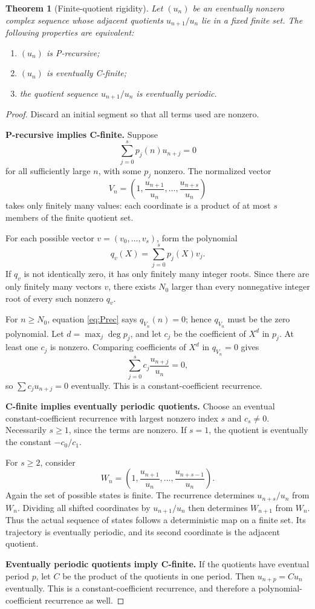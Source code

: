 \documentclass[11pt,letterpaper]{article}
\numberwithin{equation}{section}
\newtheorem{theorem}{Theorem}[section]
\theoremstyle{definition}
\theoremstyle{remark}
\begin{document}
\begin{theorem}[Finite-quotient rigidity]\label{thm:rigidity}
Let $(u_n)$ be an eventually nonzero complex sequence whose adjacent quotients $u_{n+1}/u_n$ lie in a fixed finite set. The following properties are equivalent:
\begin{enumerate}[label=(\roman*)]
\item $(u_n)$ is P-recursive;
\item $(u_n)$ is eventually C-finite;
\item the quotient sequence $u_{n+1}/u_n$ is eventually periodic.
\end{enumerate}
\end{theorem}
\begin{proof}
Discard an initial segment so that all terms used are nonzero.

\textbf{P-recursive implies C-finite.}
Suppose
\begin{equation}\label{eq:Prec}
 \sum_{j=0}^s p_j(n)u_{n+j}=0
\end{equation}
for all sufficiently large $n$, with some $p_j$ nonzero. The normalized vector
\[
 V_n=\left(1,\frac{u_{n+1}}{u_n},\ldots,\frac{u_{n+s}}{u_n}\right)
\]
takes only finitely many values: each coordinate is a product of at most $s$ members of the finite quotient set.

For each possible vector $v=(v_0,\ldots,v_s)$, form the polynomial
\[
 q_v(X)=\sum_{j=0}^s p_j(X)v_j.
\]
If $q_v$ is not identically zero, it has only finitely many integer roots. Since there are only finitely many vectors $v$, there exists $N_0$ larger than every nonnegative integer root of every such nonzero $q_v$.

For $n\ge N_0$, equation \eqref{eq:Prec} says $q_{V_n}(n)=0$; hence $q_{V_n}$ must be the zero polynomial. Let $d=\max_j\deg p_j$, and let $c_j$ be the coefficient of $X^d$ in $p_j$. At least one $c_j$ is nonzero. Comparing coefficients of $X^d$ in $q_{V_n}=0$ gives
\[
 \sum_{j=0}^s c_j\frac{u_{n+j}}{u_n}=0,
\]
so $\sum c_j u_{n+j}=0$ eventually. This is a constant-coefficient recurrence.

\textbf{C-finite implies eventually periodic quotients.}
Choose an eventual constant-coefficient recurrence with largest nonzero index $s$ and $c_s\ne0$. Necessarily $s\ge1$, since the terms are nonzero. If $s=1$, the quotient is eventually the constant $-c_0/c_1$.

For $s\ge2$, consider
\[
 W_n=\left(1,\frac{u_{n+1}}{u_n},\ldots,\frac{u_{n+s-1}}{u_n}\right).
\]
Again the set of possible states is finite. The recurrence determines $u_{n+s}/u_n$ from $W_n$. Dividing all shifted coordinates by $u_{n+1}/u_n$ then determines $W_{n+1}$ from $W_n$. Thus the actual sequence of states follows a deterministic map on a finite set. Its trajectory is eventually periodic, and its second coordinate is the adjacent quotient.

\textbf{Eventually periodic quotients imply C-finite.}
If the quotients have eventual period $p$, let $C$ be the product of the quotients in one period. Then $u_{n+p}=Cu_n$ eventually. This is a constant-coefficient recurrence, and therefore a polynomial-coefficient recurrence as well.
\end{proof}
\end{document}
